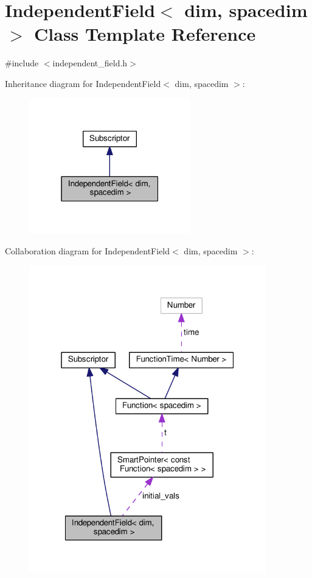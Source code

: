 \hypertarget{class_independent_field}{}\section{Independent\+Field$<$ dim, spacedim $>$ Class Template Reference}
\label{class_independent_field}


{\ttfamily \#include $<$independent\+\_\+field.\+h$>$}



Inheritance diagram for Independent\+Field$<$ dim, spacedim $>$\+:\nopagebreak
\begin{figure}[H]
\begin{center}
\leavevmode
\includegraphics[width=199pt]{class_independent_field__inherit__graph}
\end{center}
\end{figure}


Collaboration diagram for Independent\+Field$<$ dim, spacedim $>$\+:\nopagebreak
\begin{figure}[H]
\begin{center}
\leavevmode
\includegraphics[width=292pt]{class_independent_field__coll__graph}
\end{center}
\end{figure}
